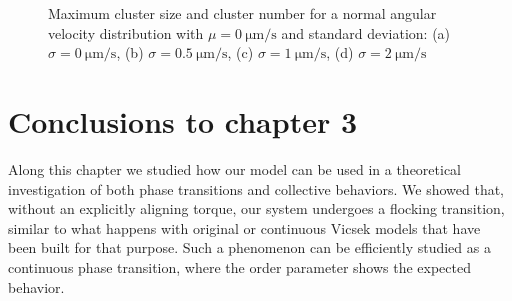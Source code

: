 \documentclass[../../master_thesis_np.tex]{subfiles}
\begin{document}
		\begin{figure}[htp]
			\centering\
			\\
			\\
			
			\caption{Maximum cluster size and cluster number for a normal angular velocity distribution with $\mu = \SI{0}{\um\per\second}$ and standard deviation: (a) $\sigma = \SI{0}{\um\per\second}$, (b) $\sigma = \SI{0.5}{\um\per\second}$, (c) $\sigma = \SI{1}{\um\per\second}$, (d) $\sigma = \SI{2}{\um\per\second}$}
			\label{fig:lj_av_clust}
		\end{figure}
		
    \section{Conclusions to chapter 3}
    Along this chapter we studied how our model can be used in a theoretical investigation of both phase transitions and collective behaviors.
    We showed that, without an explicitly aligning torque, our system undergoes a flocking transition, similar to what happens with original or continuous Vicsek models that have been built for that purpose.
    Such a phenomenon can be efficiently studied as a continuous phase transition, where the order parameter shows the expected behavior.
    
    
    
\end{document}
